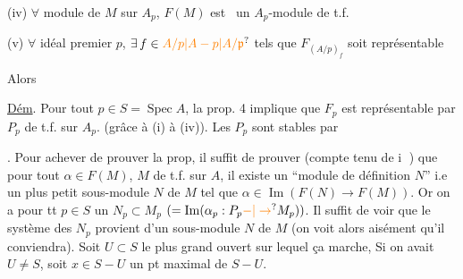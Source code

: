 (iv) $\forall$ module de   $M$ sur $A_p$, $F(M)$ est \ un $A_p$-module de t.f.

(v) $\forall$ idéal premier $p$, \deleted{$\unsure{\forall}$} $\exists\, f\in\unsure{A/p|A-p|A/\mathfrak p}$ tels que $F_{(A/p)_f}$ soit représentable

Alors 

\uline{Dém}. Pour tout $p\in S=\operatorname{Spec} A$, la prop. 4 implique que $F_p$ est représentable par $P_p$ de t.f. sur $A_p$. (grâce à (i) à (iv)). Les $P_p$ sont stables par

. Pour achever de prouver la prop, il suffit de prouver (compte tenu de \textcircled{\scriptsize i} ) que pour tout $\alpha\in F(M)$, $M$ de t.f. sur $A$, il existe un ``module de définition $N$'' i.e un plus petit sous-module $N$ de $M$ tel que $\alpha\in\operatorname{Im}(F(N)\to F(M))$. Or on a pour tt $p\in S$ un $N_p\subset M_p$ $(=\operatorname{Im}(\alpha_p:P_p\unsure{-|\to} M_p))$.  Il suffit de voir que le système des $N_p$ provient d'un sous-module $N$ de $M$ (on voit alors aisément qu'il conviendra). Soit $U\subset S$ le plus grand ouvert sur lequel ça marche,  Si on avait $U\ne S$, soit $x\in S-U$  un pt maximal de $S-U$.

